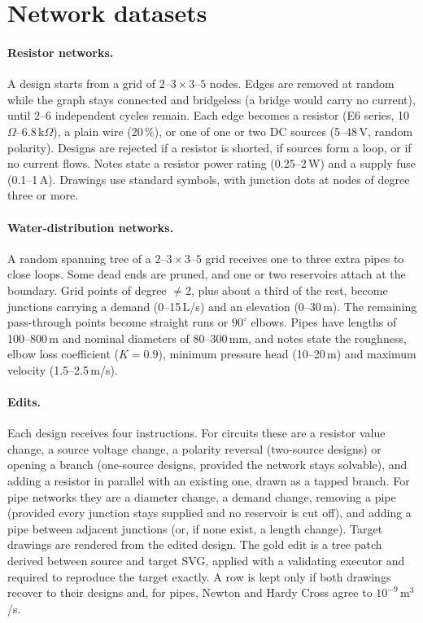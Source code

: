 \section{Network datasets}
\label{sec:data}

\paragraph{Resistor networks.} A design starts from a grid of $2$--$3 \times 3$--$5$ nodes. Edges are removed
at random while the graph stays connected and bridgeless (a bridge would carry no current), until $2$--$6$
independent cycles remain. Each edge becomes a resistor (E6 series, 10\,$\Omega$--6.8\,k$\Omega$), a plain wire
(20\,\%), or one of one or two DC sources (5--48\,V, random polarity). Designs are rejected if a resistor is
shorted, if sources form a loop, or if no current flows. Notes state a resistor power rating (0.25--2\,W) and a
supply fuse (0.1--1\,A). Drawings use standard symbols, with junction dots at nodes of degree three or more.

\paragraph{Water-distribution networks.} A random spanning tree of a $2$--$3 \times 3$--$5$ grid receives one to
three extra pipes to close loops. Some dead ends are pruned, and one or two reservoirs attach at the boundary.
Grid points of degree $\neq 2$, plus about a third of the rest, become junctions carrying a demand
(0--15\,L/s) and an elevation (0--30\,m). The remaining pass-through points become straight runs or
$90^\circ$ elbows. Pipes have lengths of 100--800\,m and nominal diameters of 80--300\,mm, and notes state the
roughness, elbow loss coefficient ($K=0.9$), minimum pressure head (10--20\,m) and maximum velocity
(1.5--2.5\,m/s).

\paragraph{Edits.} Each design receives four instructions. For circuits these are a resistor value change, a
source voltage change, a polarity reversal (two-source designs) or opening a branch (one-source designs,
provided the network stays solvable), and adding a resistor in parallel with an existing one, drawn as a
tapped branch. For pipe networks they are a diameter change, a demand change, removing a pipe (provided every
junction stays supplied and no reservoir is cut off), and adding a pipe between adjacent junctions (or, if
none exist, a length change). Target drawings are rendered from the edited design. The gold edit is a tree patch
derived between source and target SVG, applied with a validating executor and required to reproduce the
target exactly. A row is kept only if both drawings recover to their designs and, for pipes, Newton and Hardy
Cross agree to $10^{-9}$\,m$^3$/s.

